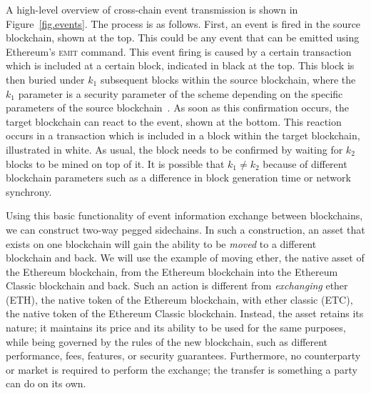A high-level overview of cross-chain event transmission is shown in
Figure~\ref{fig.events}. The process is as follows. First, an event is fired in
the source blockchain, shown at the top. This could be any event that can be
emitted using Ethereum's \textsc{emit} command. This event firing is caused by a
certain transaction which is included at a certain block, indicated in black at
the top. This block is then buried under $k_1$ subsequent blocks within the
source blockchain, where the $k_1$ parameter is a security parameter of the
scheme depending on the specific parameters of the source
blockchain~\cite{EC:GarKiaLeo15}. As soon as this confirmation occurs, the
target blockchain can react to the event, shown at the bottom. This reaction
occurs in a transaction which is included in a block within the target
blockchain, illustrated in white. As usual, the block needs to be confirmed by
waiting for $k_2$ blocks to be mined on top of it. It is possible that $k_1 \neq
k_2$ because of different blockchain parameters such as a difference in block
generation time or network synchrony.

Using this basic functionality of event information exchange between
blockchains, we can construct two-way pegged sidechains. In such a construction,
an asset that exists on one blockchain will gain the ability to be \emph{moved}
to a different blockchain and back. We will use the example of moving ether, the
native asset of the Ethereum blockchain, from the Ethereum blockchain into the
Ethereum Classic blockchain and back. Such an action is different from
\emph{exchanging} ether (ETH), the native token of the Ethereum blockchain, with
ether classic (ETC), the native token of the Ethereum Classic blockchain.
Instead, the asset retains its nature; it maintains its price and its ability to
be used for the same purposes, while being governed by the rules of the new
blockchain, such as different performance, fees, features, or  security
guarantees. Furthermore, no counterparty or market is required to perform the
exchange; the transfer is something a party can do on its own.
